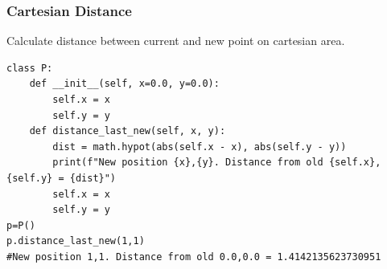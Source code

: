 \documentclass{article}
\begin{document}
\subsubsection{Cartesian Distance}
Calculate distance between current and new point on cartesian area.
\begin{lstlisting}[style=pystyle]
class P:
    def __init__(self, x=0.0, y=0.0):
        self.x = x
        self.y = y
    def distance_last_new(self, x, y):
        dist = math.hypot(abs(self.x - x), abs(self.y - y))
        print(f"New position {x},{y}. Distance from old {self.x},{self.y} = {dist}")
        self.x = x
        self.y = y
p=P()
p.distance_last_new(1,1)
#New position 1,1. Distance from old 0.0,0.0 = 1.4142135623730951
\end{lstlisting}
\end{document}
